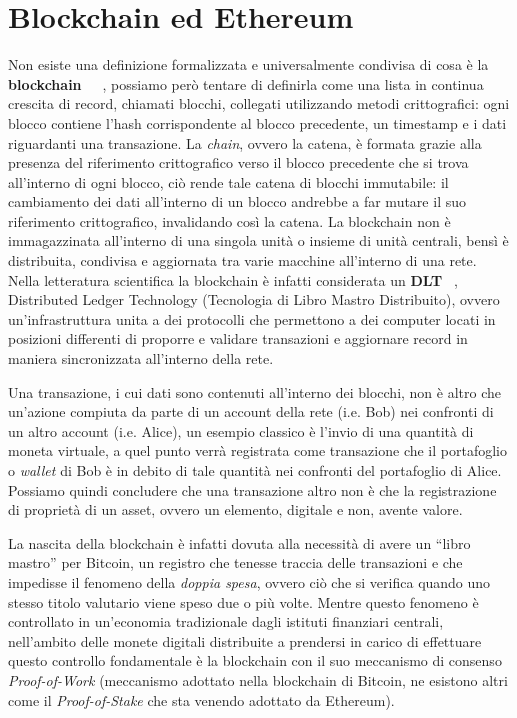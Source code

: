 \section{Blockchain ed Ethereum}
\label{sub:bc}
Non esiste una definizione formalizzata e universalmente condivisa di cosa è la
\textbf{blockchain}~\cite{block1}~\cite{block2}~\cite{block3}, possiamo però tentare di definirla come una lista in continua 
crescita di record, chiamati blocchi, collegati utilizzando metodi crittografici: 
ogni blocco contiene l'hash corrispondente al blocco precedente, un timestamp e i 
dati riguardanti una transazione. 
La \emph{chain}, ovvero la catena, è formata grazie alla presenza del riferimento 
crittografico verso il blocco precedente che si trova all'interno di ogni blocco, 
ciò rende tale catena di blocchi immutabile: il cambiamento dei dati all'interno di 
un blocco andrebbe a far mutare il suo riferimento crittografico, invalidando così la catena.
La blockchain non è immagazzinata all'interno di una singola unità o insieme di 
unità centrali, bensì è distribuita, condivisa e aggiornata tra varie macchine 
all'interno di una rete.
Nella letteratura scientifica la blockchain è infatti considerata un \textbf{DLT} ~\cite{asv-bdg-19},
Distributed Ledger Technology (Tecnologia di Libro Mastro Distribuito), ovvero
un'infrastruttura unita a dei protocolli che permettono a dei computer locati in
posizioni differenti di proporre e validare transazioni e aggiornare record in maniera
sincronizzata all'interno della rete.

Una transazione, i cui dati sono contenuti all'interno dei blocchi, non è 
altro che un'azione compiuta da parte di un account della rete (i.e. Bob) nei confronti 
di un altro account (i.e. Alice), un esempio classico è l'invio di una quantità di moneta 
virtuale, a quel punto verrà registrata come transazione che il portafoglio o \emph{wallet}
di Bob è in debito di tale quantità nei confronti del portafoglio di Alice.
Possiamo quindi concludere che una transazione altro non è che la registrazione di proprietà 
di un asset, ovvero un elemento, digitale e non, avente valore.

La nascita della blockchain è infatti dovuta alla necessità di avere un “libro mastro” per 
Bitcoin, un registro che tenesse traccia delle transazioni e che impedisse il fenomeno della 
\emph{doppia spesa}, ovvero ciò che si verifica quando uno stesso titolo valutario viene speso 
due o più volte. Mentre questo fenomeno è controllato in un'economia tradizionale dagli 
istituti finanziari centrali, nell'ambito delle monete digitali distribuite a prendersi 
in carico di effettuare questo controllo fondamentale è la blockchain con il suo 
meccanismo di consenso \emph{Proof-of-Work} 
(meccanismo adottato nella blockchain di Bitcoin, 
ne esistono altri come il \emph{Proof-of-Stake} che sta venendo adottato da Ethereum).

